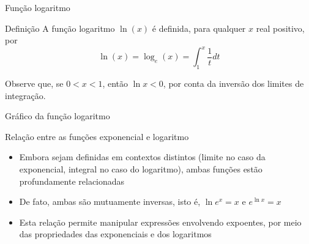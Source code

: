 \begin{frame}[fragile]{Função logaritmo}

    \begin{block}{Definição}
        A função logaritmo $\ln(x)$ é definida, para qualquer $x$ real positivo, por
        $$
            \ln(x) = \log_e(x) = \int_1^x \frac{1}{t}dt
        $$
    \end{block}

    \vspace{0.2in}

    Observe que, se $0 < x < 1$, então $\ln x < 0$, por conta da inversão dos limites de integração.

\end{frame}

\begin{frame}[fragile]{Gráfico da função logaritmo}

    \begin{figure}
        \centering



    \end{figure}

\end{frame}

\begin{frame}[fragile]{Relação entre as funções exponencial e logaritmo}

    \begin{itemize}
        \item Embora sejam definidas em contextos distintos (limite no caso da exponencial, integral no caso do logaritmo), ambas funções estão profundamente relacionadas

        \item De fato, ambas são mutuamente inversas, isto é, $\ln e^x = x$ e $e^{\ln x} = x$

        \item Esta relação permite manipular expressões envolvendo expoentes, por meio das propriedades das exponenciais e dos logaritmos
    \end{itemize}

\end{frame}

